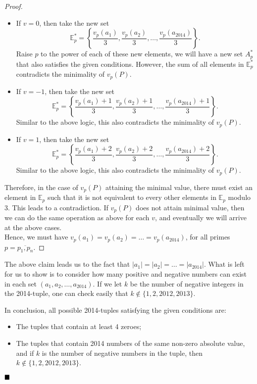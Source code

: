 \documentclass[11pt]{article}
\newenvironment{solution}[1][Solution]{%
  \proof[\normalfont \faPenNib \hspace{0.2cm} \ttfamily \scshape \large #1]%
}{\(\hfill \blacksquare\){\parfillskip0pt\par}}
\theoremstyle{definition}
\begin{document}
\begin{solution}
\begin{proof}
                \begin{itemize}
                    \item If \(v = 0\), then take the new set
                    \[\mathbb{E}_p^* = \left\{\frac{v_p(a_1)}{3}, \frac{v_p(a_2)}{3}, \dots, \frac{v_p(a_{2014})}{3}\right\}.\]
                    Raise \(p\) to the power of each of these new elements, we will have a new set \(A_p^*\) that also satisfies the given conditions. However, the sum of all elements in \(\mathbb{E}_p^*\) contradicts the minimality of \(v_p(P)\).
                    \item If \(v = -1\), then take the new set
                    \[\mathbb{E}_p^* = \left\{\frac{v_p(a_1) + 1}{3}, \frac{v_p(a_2) + 1}{3}, \dots, \frac{v_p(a_{2014}) + 1}{3}\right\}.\]
                    Similar to the above logic, this also contradicts the minimality of \(v_p(P)\).
                    \item If \(v = 1\), then take the new set
                    \[\mathbb{E}_p^* = \left\{\frac{v_p(a_1) + 2}{3}, \frac{v_p(a_2) + 2}{3}, \dots, \frac{v_p(a_{2014}) + 2}{3}\right\}.\]
                    Similar to the above logic, this also contradicts the minimality of \(v_p(P)\).
                \end{itemize}

                Therefore, in the case of \(v_p(P)\) attaining the minimal value, there must exist an element in \(\mathbb{E}_p\) such that it is not equivalent to every other elements in \(\mathbb{E}_p\) modulo 3. This leads to a contradiction. If \(v_p(P)\) does not attain minimal value, then we can do the same operation as above for each \(v\), and eventually we will arrive at the above cases.\\
                Hence, we must have \(v_p(a_1) = v_p(a_2) = \dots = v_p(a_{2014})\), for all primes \(p = \overline{p_1,p_n}\).
            \end{proof}

            The above claim leads us to the fact that \(|a_1| = |a_2| = \dots = |a_{2014}|\). What is left for us to show is to consider how many positive and negative numbers can exist in each set \((a_1, a_2, \dots, a_{2014})\). If we let \(k\) be the number of negative integers in the 2014-tuple, one can check easily that \(k \not\in \{1,2,2012,2013\}\).

            In conclusion, all possible 2014-tuples satisfying the given conditions are:
            
            \begin{itemize}
                \item The tuples that contain at least 4 zeroes;
                \item The tuples that contain 2014 numbers of the same non-zero absolute value, and if \(k\) is the number of negative numbers in the tuple, then \(k \not\in \{1,2,2012,2013\}\).
            \end{itemize}
        \end{solution}
\end{document}

